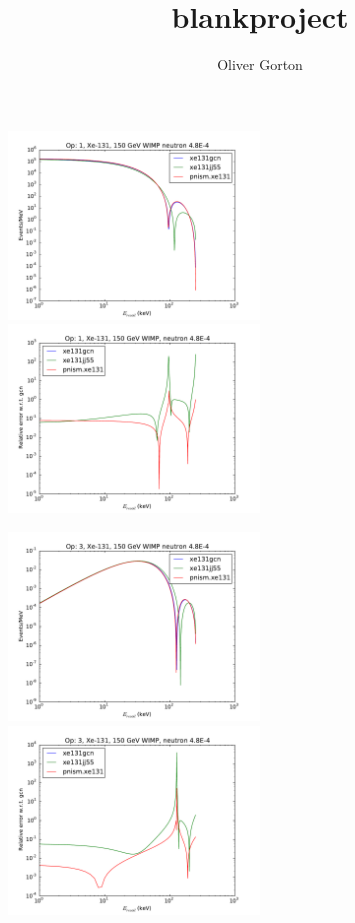 \documentclass{article}
\title{blankproject}
\author{Oliver Gorton}
\begin{document}
\includegraphics[width=0.5\textwidth]{xe131-o1}
\includegraphics[width=0.5\textwidth]{xe131-o1-relerr}

\includegraphics[width=0.5\textwidth]{xe131-o3}
\includegraphics[width=0.5\textwidth]{xe131-o3-relerr}
\end{document}

